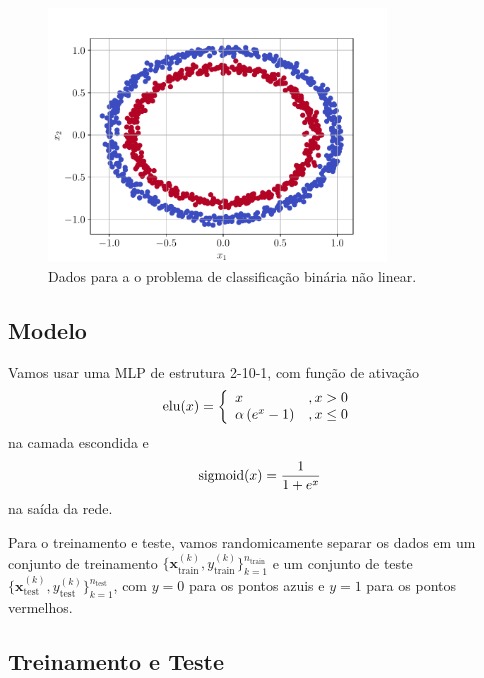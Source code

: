 \begin{figure}[H]
  \centering
  \includegraphics[width=0.8\textwidth]{./cap_mlp/dados/fig_classbin/fig}
  \caption{Dados para a o problema de classificação binária não linear.}
  \label{cap_mlp_sec_classbin:fig:dados}
\end{figure}

\subsection{Modelo}
\badgeConstrucao

Vamos usar uma MLP de estrutura 2-10-1, com função de ativação
\begin{equation}
  \operatorname{elu}(x) = \left\{
    \begin{array}{ll}
      x &, x > 0\\
      \alpha\left(e^x - 1\right) &, x \leq 0
    \end{array}
\right.
\end{equation}
na camada escondida e
\begin{equation}
  \operatorname{sigmoid}(x) = \frac{1}{1 + e^x}
\end{equation}
na saída da rede.

Para o treinamento e teste, vamos randomicamente separar os dados em um conjunto de treinamento $\{\pmb{x}_{\text{train}}^{(k)}, y_{\text{train}}^{(k)}\}_{k=1}^{n_{\text{train}}}$ e um conjunto de teste $\{\pmb{x}_{\text{test}}^{(k)}, y_{\text{test}}^{(k)}\}_{k=1}^{n_{\text{test}}}$, com $y=0$ para os pontos azuis e $y=1$ para os pontos vermelhos.

\subsection{Treinamento e Teste}
\badgeConstrucao

